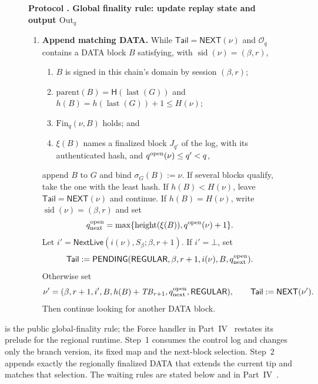\documentclass[11pt,a4paper]{article}
\newcommand{\Hash}{\mathsf H}
\newcommand{\TB}{\mathit{TB}}
\newcommand{\tagg}[1]{\ensuremath{\mathsf{#1}}}
\newcounter{protocol}
\newenvironment{protocol}[3][htbp]{\begin{figure}[#1]\refstepcounter{protocol}\label{#2}
\begin{mdframed}[linewidth=.6pt,skipabove=0pt,skipbelow=0pt,
innertopmargin=7pt,innerbottommargin=7pt]\small
\textbf{Protocol \theprotocol. #3}\par\smallskip}{\end{mdframed}\end{figure}}
\begin{document}
\begin{protocol}[H]{alg:global-rule}{Global finality rule: update replay state and output $\mathrm{Out}_q$}
\begin{enumerate}[label=\textbf{\arabic*)},itemsep=3pt]
\item \textbf{Append matching DATA.}
While $\mathsf{Tail}=\tagg{NEXT}(\nu)$ and $\mathcal O_q$ contains a
DATA block $B$ satisfying, with
$\operatorname{sid}(\nu)=(\beta,r)$,
  \begin{enumerate}[label=(\alph*),itemsep=1pt]
  \item $B$ is signed in this chain's domain by session $(\beta,r)$;
  \item $\mathrm{parent}(B)=\Hash(\operatorname{last}(G))$ and
  $h(B)=h(\operatorname{last}(G))+1\le H(\nu)$;
  \item $\mathrm{Fin}_q(\nu,B)$ holds; and
  \item $\xi(B)$ names a finalized block $J_{q'}$ of the log, with its
  authenticated hash, and $q^{\rm open}(\nu)\le q'<q$,
  \end{enumerate}
append $B$ to $G$ and bind $\sigma_G(B):=\nu$.  If several blocks
qualify, take the one with the least hash.  If $h(B)<H(\nu)$, leave
$\mathsf{Tail}=\tagg{NEXT}(\nu)$ and continue.  If $h(B)=H(\nu)$, write
$\operatorname{sid}(\nu)=(\beta,r)$ and set
\[
 q^{\rm open}_{\rm next}=
 \max\{\operatorname{height}(\xi(B)),q^{\rm open}(\nu)+1\}.
\]
Let $i'=\tagg{NextLive}(i(\nu),S_\beta;\beta,r+1)$. If $i'=\bot$, set
\[
 \mathsf{Tail}:=\tagg{PENDING}
 (\tagg{REGULAR},\beta,r+1,i(\nu),B,q^{\rm open}_{\rm next}).
\]
Otherwise set
\[
 \nu'=(\beta,r+1,i',B,h(B)+\TB_{r+1},
       q^{\rm open}_{\rm next},\tagg{REGULAR}),
 \qquad \mathsf{Tail}:=\tagg{NEXT}(\nu').
\]
Then continue looking for another DATA block.
\end{enumerate}
\end{protocol}

 is the public global-finality rule;
the Force handler in Part~IV~\cite{part4} restates its prelude for the regional runtime. Step~1 consumes the control log and changes only the
branch version, its fixed map and the next-block selection. Step~2
appends exactly the regionally finalized DATA that extends the current
tip and matches that selection. The waiting rules are stated below and
in Part~IV~\cite{part4}.
\end{document}
